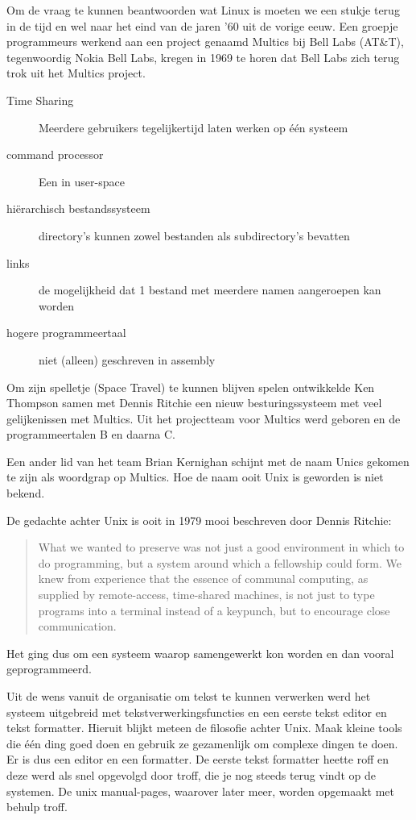 Om de vraag te kunnen beantwoorden wat Linux is moeten we een stukje terug in de tijd en wel naar het eind van de jaren '60 uit de vorige eeuw. Een groepje programmeurs werkend aan een project genaamd Multics bij Bell Labs (AT\&T), tegenwoordig Nokia Bell Labs, kregen in 1969 te horen dat Bell Labs zich terug trok uit het Multics project.

\begin{description}
\item[Time Sharing] Meerdere gebruikers tegelijkertijd laten werken op \'e\'en systeem
\item[command processor] Een  in user-space
\item[hi\"erarchisch bestandssysteem] directory's kunnen zowel bestanden als subdirectory's bevatten
\item[links] de mogelijkheid dat 1 bestand met meerdere namen aangeroepen kan worden
\item[hogere programmeertaal] niet (alleen) geschreven in assembly
\end{description}

Om zijn spelletje (Space Travel) te kunnen blijven spelen ontwikkelde Ken Thompson samen met Dennis Ritchie een nieuw besturingssysteem met veel gelijkenissen met Multics. Uit het projectteam voor Multics werd  geboren en de programmeertalen B en daarna C.

Een ander lid van het team Brian Kernighan schijnt met de naam Unics gekomen te zijn als woordgrap op Multics. Hoe de naam ooit Unix is geworden is niet bekend.\par

De gedachte achter Unix is ooit in 1979 mooi beschreven door Dennis Ritchie:
\begin{quotation}
What we wanted to preserve was not just a good environment in which to do programming, but a system around which a fellowship could form. We knew from experience that the essence of communal computing, as supplied by remote-access, time-shared machines, is not just to type programs into a terminal instead of a keypunch, but to encourage close communication.
\end{quotation}
Het ging dus om een systeem waarop samengewerkt kon worden en dan vooral geprogrammeerd.

Uit de wens vanuit de organisatie om tekst te kunnen verwerken werd het systeem uitgebreid met tekstverwerkingsfuncties
en een eerste tekst editor en tekst formatter. Hieruit blijkt meteen de filosofie achter Unix. Maak kleine tools die
\'e\'en ding goed doen en gebruik ze gezamenlijk om complexe dingen te doen. Er is dus een editor en een formatter. De
eerste tekst formatter heette roff en deze werd als snel opgevolgd door troff, die je nog steeds terug vindt op de
systemen. De unix manual-pages, waarover later meer, worden opgemaakt met behulp troff.\par


